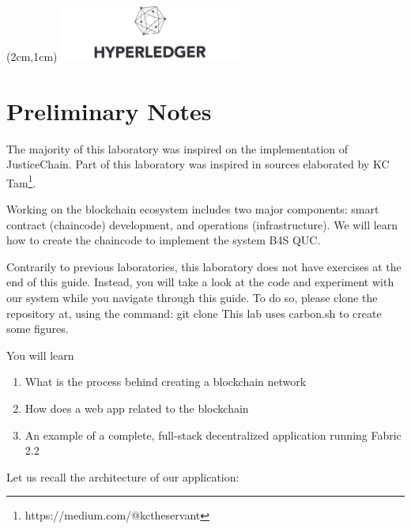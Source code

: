 \documentclass[12pt,a4paper]{article}
\theoremstyle{definition}
\begin{document}
\textblockorigin{-34pt}{-12pt}
\begin{textblock*}{10cm}(2cm,1cm)
\includegraphics[width=6cm]{hyperledger.png}
\end{textblock*}
\newtheorem{mydef}{Definition}

\section*{Preliminary Notes}
The majority of this laboratory was inspired on the implementation of JusticeChain\cite{belchior2019_audits}. Part of this laboratory was inspired in sources elaborated by KC Tam\footnote{https://medium.com/@kctheservant}.

Working on the blockchain ecosystem includes two major  components: smart contract (chaincode) development, and operations (infrastructure). We will learn how to create the chaincode to implement the system B4S QUC.  

Contrarily to previous laboratories, this laboratory does not have exercises at the end of this guide. Instead, you will take a look at the code and experiment with our system while you navigate through this guide.
To do so, please clone the repository at, using the command:
{git clone}
This lab uses carbon.sh to create some figures.

You will learn
\begin{enumerate}
    \item What is the process behind creating a blockchain network
    \item How does a web app related to the blockchain
    \item An example of a complete, full-stack decentralized application running Fabric 2.2
\end{enumerate}

Let us recall the architecture of our application:
\end{document}

